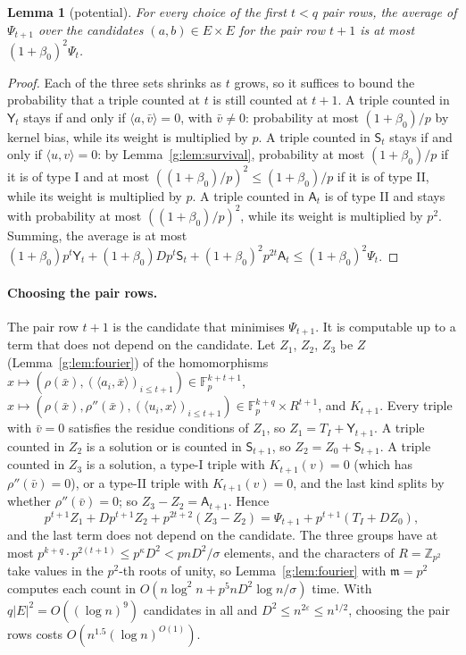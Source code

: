 \documentclass[11pt]{article}
\newtheorem{lemma}[theorem]{Lemma}
\theoremstyle{definition}
\theoremstyle{remark}
\newcommand{\Z}{\mathbb{Z}}
\newcommand{\Fp}{\mathbb{F}_p}
\newcommand{\eps}{\varepsilon}
\begin{document}
\begin{lemma}[potential]\label{g:lem:potential}
For every choice of the first $t<q$ pair rows, the average of $\Psi_{t+1}$ over the candidates $(a,b)\in E\times E$ for the pair row $t+1$ is at most $(1+\beta_0)^2\Psi_t$.
\end{lemma}
\begin{proof}
Each of the three sets shrinks as $t$ grows, so it suffices to bound the probability that a triple counted at $t$ is still counted at $t+1$. A triple counted in $\mathsf Y_t$ stays if and only if $\langle a,\bar v\rangle=0$, with $\bar v\ne0$: probability at most $(1+\beta_0)/p$ by kernel bias, while its weight is multiplied by $p$. A triple counted in $\mathsf S_t$ stays if and only if $\langle u,v\rangle=0$: by Lemma~\ref{g:lem:survival}, probability at most $(1+\beta_0)/p$ if it is of type I and at most $((1+\beta_0)/p)^2\le(1+\beta_0)/p$ if it is of type II, while its weight is multiplied by $p$. A triple counted in $\mathsf A_t$ is of type II and stays with probability at most $((1+\beta_0)/p)^2$, while its weight is multiplied by $p^2$. Summing, the average is at most $(1+\beta_0)p^t\mathsf Y_t+(1+\beta_0)Dp^t\mathsf S_t+(1+\beta_0)^2p^{2t}\mathsf A_t\le(1+\beta_0)^2\Psi_t$.
\end{proof}

\paragraph{Choosing the pair rows.} The pair row $t+1$ is the candidate that minimises $\Psi_{t+1}$. It is computable up to a term that does not depend on the candidate. Let $Z_1$, $Z_2$, $Z_3$ be $Z$ (Lemma~\ref{g:lem:fourier}) of the homomorphisms $x\mapsto(\rho(\bar x),(\langle a_i,\bar x\rangle)_{i\le t+1})\in\Fp^{k+t+1}$, $x\mapsto(\rho(\bar x),\rho''(\bar x),(\langle u_i,x\rangle)_{i\le t+1})\in\Fp^{k+q}\times R^{t+1}$, and $K_{t+1}$. Every triple with $\bar v=0$ satisfies the residue conditions of $Z_1$, so $Z_1=T_I+\mathsf Y_{t+1}$. A triple counted in $Z_2$ is a solution or is counted in $\mathsf S_{t+1}$, so $Z_2=Z_0+\mathsf S_{t+1}$. A triple counted in $Z_3$ is a solution, a type-I triple with $K_{t+1}(v)=0$ (which has $\rho''(\bar v)=0$), or a type-II triple with $K_{t+1}(v)=0$, and the last kind splits by whether $\rho''(\bar v)=0$; so $Z_3-Z_2=\mathsf A_{t+1}$. Hence
\[
p^{t+1}Z_1+Dp^{t+1}Z_2+p^{2t+2}(Z_3-Z_2)=\Psi_{t+1}+p^{t+1}(T_I+DZ_0),
\]
and the last term does not depend on the candidate. The three groups have at most $p^{k+q}\cdot p^{2(t+1)}\le p^{\kappa}D^2<pnD^2/\sigma$ elements, and the characters of $R=\Z_{p^2}$ take values in the $p^2$-th roots of unity, so Lemma~\ref{g:lem:fourier} with $\mathfrak m=p^2$ computes each count in $O(n\log^2n+p^5nD^2\log n/\sigma)$ time. With $q|E|^2=O((\log n)^9)$ candidates in all and $D^2\le n^{2\eps}\le n^{1/2}$, choosing the pair rows costs $O(n^{1.5}(\log n)^{O(1)})$.
\end{document}
